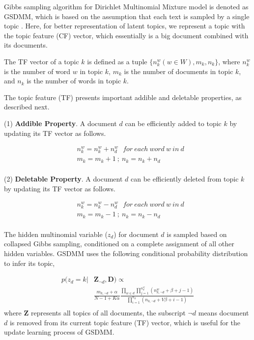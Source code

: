 \documentclass[10pt,journal,compsoc]{IEEEtran}
\begin{document}
Gibbs sampling algorithm for Dirichlet Multinomial Mixture model is denoted as GSDMM, which is based on the assumption that each text is sampled by a single topic \cite{yin2014dirichlet}. Here, for better representation of latent topics, we represent a topic with the topic feature (CF) vector, which essentially is a big document combined with its documents. 

The TF vector of a topic $k$ is defined as a tuple $\{n_k^w (w\in W), m_k, n_k\}$, where $n_k^w$ is the number of word $w$ in topic $k$, $m_k$ is the number of documents in topic $k$, and $n_k$ is the number of words in topic $k$.

The topic feature (TF) presents important addible and deletable properties, as described next.

(1) \textbf{Addible Property}. A document $d$ can be efficiently added to topic $k$ by updating its TF vector as follows.

\[
\begin{split}
& n^w_k = n^w_k + n^w_d \ \ \ for \ each \ word \ w \ in \ d \\
& m_k = m_k + 1 \ ; \ n_k = n_k + n_d\\
 \end{split}
\]

(2) \textbf{Deletable Property}. A document $d$ can be efficiently deleted from topic $k$ by updating its TF vector as follows.

\[
  \begin{split}
& n^w_k = n^w_k - n^w_d \ \ \  for \  each \ word \ w \ in \ d \\
& m_k = m_k - 1 \ ; \ n_k = n_k - n_d\\
 \end{split}
\]

The hidden multinomial variable ($z_d$) for document $d$ is sampled based on collapsed Gibbs sampling, conditioned on a complete assignment of all other hidden variables. GSDMM uses the following conditional probability distribution to infer its topic,


\begin{equation} \label{equation1}
\begin{split}
 p(z_d=k| & \bm{Z}_{\neg{d}},\bm{D}) \propto \\
 &\frac{m_{k,\neg{d}}+\alpha}{N-1+K\alpha} \frac{\prod_{w\in d}\prod_{j=1}^{n_d^w}(n_{k,\neg{d}}^w+\beta+j-1)}{\prod_{i=1}^{n_{d}}(n_{k,\neg{d}}+V\beta+i-1)}\\
\end{split}
\end{equation}
where $\bm{Z}$ represents all topics of all documents, the subscript $\neg{d}$ means document $d$ is removed from its current topic feature (TF) vector, which is useful for the update learning process of GSDMM. 
\end{document}
